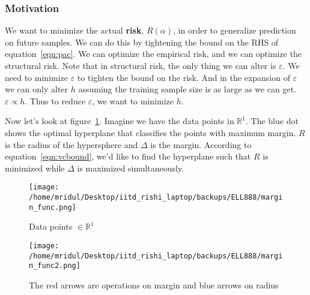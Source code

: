 \documentclass[11pt]{article}
\begin{document}
\subsubsection{Motivation}
We want to minimize the actual {\bf risk}, $R(\alpha)$, in order to generalize
prediction on future samples. We can do this by tightening the bound on the RHS
of equation~\ref{eqn:pac}. We can optimize the empirical risk, and we can
optimize the structural risk. Note that in structural risk, the only thing we
can alter is $\varepsilon$. We need to minimize $\varepsilon$ to tighten the
bound on the risk. And in the expansion of $\varepsilon$ we can only alter $h$
assuming the training sample size is as large as we can get.
$\varepsilon\propto h$. Thus to reduce $\varepsilon$, we want to minimize
$h$.\par
Now let's look at figure~\ref{fig:1}. Imagine we have the data points in
$\mathbb{R}^1$. The blue dot shows the optimal hyperplane that classifies the
points with maximum margin. $R$ is the radius of the hypersphere and $\Delta$ is
the margin. According to equation~\ref{eqn:vcbound}, we'd like to find the
hyperplane such that $R$ is minimized while $\Delta$ is maximized
simultaneously.
\begin{figure}[!htbp]
    \centering
    \texttt{[image: /home/mridul/Desktop/iitd\_rishi\_laptop/backups/ELL888/margin\_func.png]}
    \caption{\label{fig:1}Data points $\in\mathbb{R}^1$}
\end{figure}
\begin{figure}[!htbp]
    \centering
    \texttt{[image: /home/mridul/Desktop/iitd\_rishi\_laptop/backups/ELL888/margin\_func2.png]}
    \caption{\label{fig:2}The red arrows are operations on margin and blue
    arrows on radius}
\end{figure}
\end{document}
